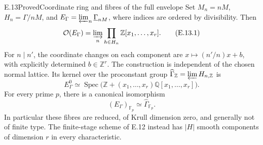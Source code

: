 \begin{statement}{E.13}{Proved}{Coordinate ring and fibres of the full envelope}
Set \(M_n=nM\), \(H_n=\Gamma/nM\), and
\(E_\Gamma=\varprojlim_n\underline\Gamma_{nM}\), where indices are
ordered by divisibility.  Then
\[
 \mathcal O(E_\Gamma)=
 \varinjlim_n\prod_{h\in H_n}\mathbb Z[x_1,\ldots,x_r].             \tag{E.13.1}
\]
For \(n\mid n'\), the coordinate changes on each component are
\(x\mapsto (n'/n)x+b\), with explicitly determined
\(b\in\mathbb Z^r\).  The construction is independent of the
chosen normal lattice.  Its kernel over the proconstant group
\(\widehat\Gamma_{\mathbb Z}=\varprojlim H_{n,\mathbb Z}\) is
\[
 E^0_\Gamma\simeq
 \operatorname{Spec}\bigl(\mathbb Z+(x_1,\ldots,x_r)
                              \mathbb Q[x_1,\ldots,x_r]\bigr).    \tag{E.13.2}
\]
For every prime \(p\), there is a canonical isomorphism
\[
                   (E_\Gamma)_{\mathbb F_p}\simeq
                   \widehat\Gamma_{\mathbb F_p}.                 \tag{E.13.3}
\]
In particular these fibres are reduced, of Krull dimension zero,
and generally not of finite type.  The finite-stage scheme of
E.12 instead has \(|H|\) smooth components of dimension \(r\) in
every characteristic.
\end{statement}
